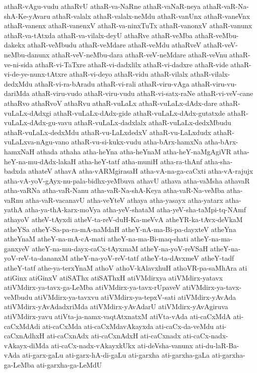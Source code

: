 {athaR-vAgu-vudu
athaRvU
athaR-va-NaRne
athaR-vaNaR-neya
athaR-vaR-Na-shA-Ke-yAvaru
athaR-valalx
athaR-valalx-neMdu
athaR-vanUnx
athaR-vaneVnx
athaR-vanenx
athaR-vanenxV
athaR-va-ninxTuTx
athaR-vanonxV
athaR-vanunx
athaR-va-tAtxda
athaR-va-vilalx-deyU
athaRve
athaR-veMba
athaR-veMbu-dakekx
athaR-veMbudu
athaR-veMdare
athaR-veMdu
athaRveV
athaR-veV-neMbu-danunx
athaR-veV-neMbu-dara
athaR-veV-neMdare
athaR-veVnu
athaR-ve-ni-sida
athaR-vi-TaTxre
athaR-vi-dadxlilx
athaR-vi-dadxre
athaR-vide
athaR-vi-de-ye-nunx-tAtxre
athaR-vi-deyo
athaR-vidu
athaR-vilalx
athaR-vilalx-dedxMdu
athaR-vi-ra-bAradu
athaR-vi-rali
athaR-viru-vAga
athaR-viru-vu-dariMda
athaR-viru-vudo
athaR-viru-vudu
athaR-vi-satx-raNe
athaR-vi-veV-cane
athaRvo
athaRvoV
athaRvu
athaR-vuLaLx
athaR-vuLaLx-dAdx-dare
athaR-vuLaLx-dAdxgi
athaR-vuLaLx-dAdx-gide
athaR-vuLaLx-dAdx-gutatxde
athaR-vuLaLx-dAdx-gu-vavu
athaR-vuLaLx-dadxlalx
athaR-vuLaLx-dedxMbudu
athaR-vuLaLx-dedxMdu
athaR-vu-LaLxdedxV
athaR-vu-LaLxdudx
athaR-vuLaLxva-nAgu-vano
athaR-vu-si-kukx-vudu
atha-bArx-hamxNa
atha-bArx-hamxNaH
athada
athaha
atha-heYna
atha-heYnaM
atha-heY-naMgAgiVR
atha-heY-na-mu-dAdx-lakaH
atha-heY-tatf
atha-muniH
atha-ra-thAnf
atha-sha-badxda
athateV
athavA
atha-vARMgirasaH
atha-vA-na-ga-caCxti
atha-vA-rajujx
atha-vA-yoV-gAyx-nu-pala-bidhx-yeMbuva
athavU
athava
atha-vaMsha
athavaR
atha-vaRNa
atha-vaR-Nanu
atha-vaR-Na-shA-Keya
atha-vaR-Na-veMba
atha-vaRnu
atha-vaR-vacanavU
atha-veYteV
athaya
atha-yasayx
atha-yatarx
atha-yathA
atha-ya-thA-karx-moVya
atha-yeV-shataM
atha-yeV-sha-taMpi-tq-NAmf
athayoV
atheV-tAyxdi
atheV-ta-reV-duH-Ka-meVvA
atheYR-ka-tAvx-deVkaM
atheYSa
atheY-Sa-pa-ra-mA-naMdaH
atheY-nA-ma-Bi-pa-dayxteV
atheYna
atheYnaM
atheY-na-mA-cA-mati
atheY-na-ma-Bi-maq-shati
atheY-na-ma-ganxyeV
atheY-na-mu-dayx-caCx-tAyxmaM
atheY-na-yoV-reVSaH
atheY-na-yoV-reV-ta-dananxM
atheY-na-yoV-reV-tatf
atheY-ta-dAvxmeV
atheY-tadf
atheY-tatf
athe-ya-terxYnaM
athoV
athoV-kAlavxhuH
athoVR-pa-saMhAra
ati
atiGinx
atiGinxV
atiSAThx
atiSAThxH
atiVMdirxya
atiVMdirx-yatavx
atiVMdirx-ya-tavx-ga-LeMba
atiVMdirx-ya-tavx-rUpaveV
atiVMdirx-ya-tavx-veMbudu
atiVMdirx-ya-tavxvu
atiVMdirx-ya-tepxV-sati
atiVMdirx-yAvAda
atiVMdirx-yAvAdadxriMda
atiVMdirx-yAvAdarU
atiVMdirx-yAvAgiruva
atiVMdirx-yavu
atiVta-ja-namx-vaqtAtxnatxM
atiVta-vAda
ati-caCxMdA
ati-caCxMdAdi
ati-caCxMda
ati-caCxMdavAkayxda
ati-caCx-da-veMdu
ati-caCxnAdhxH
ati-caCxnAdx
ati-caCxnAdxH
ati-caCxnadx
ati-caCx-nadx-vAkayx-diMda
ati-caCx-nadx-vAkayxkUkx
ati-deVsha-vanunx
ati-du-laR-Ba-vAda
ati-garx-gaLu
ati-garx-hA-di-gaLu
ati-garxha
ati-garxha-gaLa
ati-garxha-ga-LeMba
ati-garxha-ga-LeMdU
}
